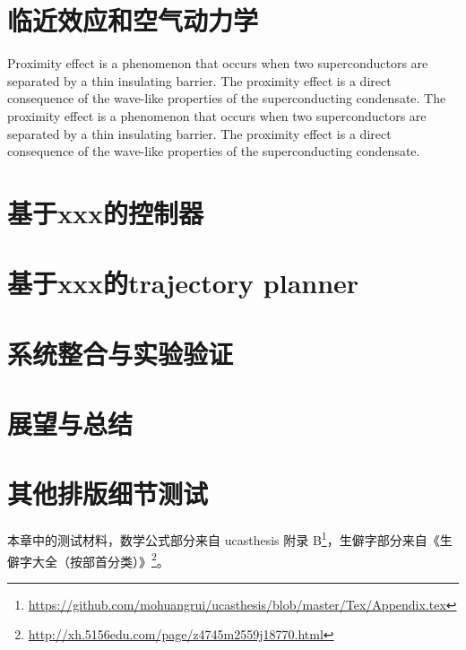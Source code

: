 \documentclass[master]{shtthesis}
\begin{document}
\chapter{临近效应和空气动力学} %

Proximity effect is a phenomenon that occurs when two superconductors are separated by a thin insulating barrier. The proximity effect is a direct consequence of the wave-like properties of the superconducting condensate. The proximity effect is a phenomenon that occurs when two superconductors are separated by a thin insulating barrier. The proximity effect is a direct consequence of the wave-like properties of the superconducting condensate.

\chapter{基于xxx的控制器} %

\chapter{基于xxx的trajectory planner} %

\chapter{系统整合与实验验证} %

\chapter{展望与总结} %



\makebiblio

\appendix %
\chapter{其他排版细节测试}
本章中的测试材料，数学公式部分来自 \textsf{ucasthesis} 附录 B\footnote{\url{https://github.com/mohuangrui/ucasthesis/blob/master/Tex/Appendix.tex}}，生僻字部分来自《生僻字大全（按部首分类）》\footnote{\url{http://xh.5156edu.com/page/z4745m2559j18770.html}}。
\end{document}
